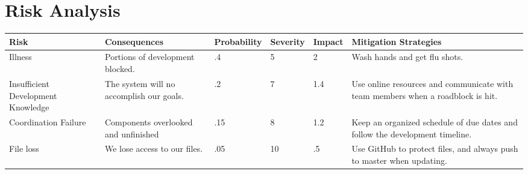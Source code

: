 \chapter{Risk Analysis}

\begin{center}
    \begin{tabular}{ | p{3cm} | p{3cm} | l | l | l | p{5cm} |}
    \hline
    Risk & Consequences & Probability & Severity & Impact & Mitigation Strategies \\ \hline
    Illness & Portions of development blocked. & .4 & 5 & 2 & Wash hands and get flu shots. \\ \hline
    Insufficient Development Knowledge & The system will no accomplish our goals. & .2 & 7 & 1.4 & Use online resources and communicate with team members when a roadblock is hit. \\ \hline
    Coordination Failure & Components overlooked and unfinished & .15 & 8 & 1.2 & Keep an organized schedule of due dates and follow the development timeline. \\ \hline
    File loss & We lose access to our files. & .05 & 10 & .5 & Use GitHub to protect files, and always push to master when updating. \\
    \hline
    \end{tabular}
\end{center}
